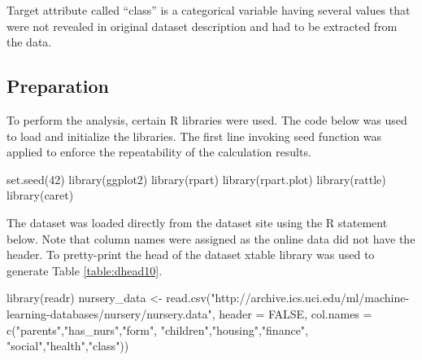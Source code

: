Target attribute called ``class'' is a categorical variable having
several values that were not revealed in original dataset description
and had to be extracted from the data.

\hypertarget{preparation}{%
\subsection{Preparation}\label{preparation}}

To perform the analysis, certain R libraries were used. The code below
was used to load and initialize the libraries. The first line invoking
seed function was applied to enforce the repeatability of the
calculation results.

\begin{Schunk}
\begin{Sinput}
set.seed(42)
library(ggplot2)
library(rpart)
library(rpart.plot)
library(rattle)
library(caret)
\end{Sinput}
\end{Schunk}

The dataset was loaded directly from the dataset site
\citep{noauthor_uci_nodate} using the R statement below. Note that
column names were assigned as the online data did not have the header.
To pretty-print the head of the dataset xtable \citep{R-xtable} library
was used to generate Table \ref{table:dhead10}.

\begin{Schunk}
\begin{Sinput}
library(readr)
nursery_data <- 
  read.csv("http://archive.ics.uci.edu/ml/machine-learning-databases/nursery/nursery.data", 
  header = FALSE, 
  col.names = c("parents","has_nurs","form", "children","housing","finance",
                "social","health","class"))
\end{Sinput}
\end{Schunk}

